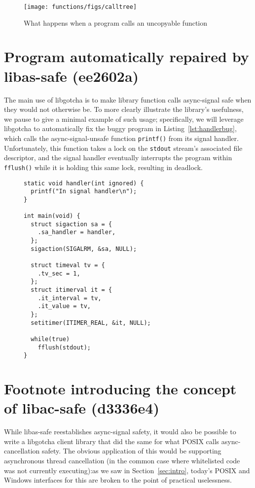 \documentclass[12pt,letterpaper,openright]{report}
\makeatletter
\let\includegraphics@\includegraphics
\renewcommand{\includegraphics}[2][]{\includegraphics@[#1]{\includegraphicsdir#2}}
\newcommand{\includegraphicsdir}{}
\makeatother
\begin{document}
\begin{figure}
\texttt{[image: functions/figs/calltree]}
\caption{What happens when a program calls an uncopyable function}
\label{fig:uncopyable}
\end{figure}


\section{Program automatically repaired by libas-safe (ee2602a)}

The main use of libgotcha is to make library function calls async-signal safe when
they would not otherwise be.  To more clearly illustrate the library's usefulness, we
pause to give a minimal example of such usage; specifically, we will leverage
libgotcha to automatically fix the buggy program in Listing~\ref{lst:handlerbug},
which calls the async-signal-unsafe function \texttt{printf()} from its signal
handler.  Unfortunately, this function takes a lock on the \texttt{stdout} stream's
associated file descriptor, and the signal handler eventually interrupts the program
within \texttt{fflush()} while it is holding this same lock, resulting in deadlock.

\begin{figure}
\begin{lstlisting}[label=lst:handlerbug,caption=C program with a buggy signal handler]
static void handler(int ignored) {
  printf("In signal handler\n");
}

int main(void) {
  struct sigaction sa = {
    .sa_handler = handler,
  };
  sigaction(SIGALRM, &sa, NULL);

  struct timeval tv = {
    .tv_sec = 1,
  };
  struct itimerval it = {
    .it_interval = tv,
    .it_value = tv,
  };
  setitimer(ITIMER_REAL, &it, NULL);

  while(true)
    fflush(stdout);
}
\end{lstlisting}
\end{figure}


\section{Footnote introducing the concept of libac-safe (d3336e4)}

While libas-safe reestablishes async-signal safety, it would also be
possible to write a libgotcha client library that did the same for what POSIX calls
async-cancellation safety.  The obvious application of this would be supporting
asynchronous thread cancellation (in the common case where whitelisted code was not
currently executing):\@ as we saw in Section~\ref{sec:intro}, today's POSIX and
Windows interfaces for this are broken to the point of practical uselessness.
\end{document}
